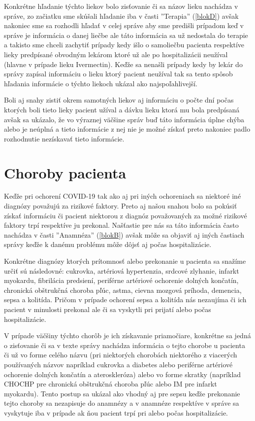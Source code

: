 Konkrétne hľadanie týchto liekov bolo zisťovanie či sa názov lieku nachádza v správe, zo začiatku sme skúšali hľadanie iba v časti ''Terapia'' (\ref{blokD}) avšak nakoniec sme sa rozhodli hľadať v celej správe aby sme predišli prípadom keď v správe je informácia o danej liečbe ale táto informácia sa už nedostala do terapie a takisto sme chceli zachytiť prípady kedy išlo o samoliečbu pacienta respektíve lieky predpísané obvodným lekárom ktoré už ale po hospitalizácii neužíval (hlavne v prípade lieku Ivermectin). Keďže sa nenašli prípady kedy by lekár do správy zapísal informáciu o lieku ktorý pacient neužíval tak sa tento spôsob hľadania informácie o týchto liekoch ukázal ako najspoľahlivejší.
 
Boli aj snahy zistiť okrem samotných liekov aj informáciu o počte dní počas ktorých boli tieto lieky pacient užíval a dávku lieku ktorá mu bola predpísaná avšak sa ukázalo, že vo výraznej väčšine správ buď táto informácia úplne chýba alebo je neúplná a tieto informácie z nej nie je možné získať preto nakoniec padlo rozhodnutie nezískavať tieto informácie.

\section{Choroby pacienta}

Keďže pri ochorení COVID-19 tak ako aj pri iných ochoreniach sa niektoré iné diagnózy považujú za rizikové faktory. Preto aj našou snahou bolo sa pokúsiť získať informáciu či pacient niektorou z diagnóz považovaných za možné rizikové faktory trpí respektíve ju prekonal. Našťastie pre nás sa táto informácia často nachádza v časti ''Anamnéza'' (\ref{blokB}) avšak môže sa objaviť aj iných častiach správy keďže k danému problému môže dôjsť aj počas hospitalizácie.

Konkrétne diagnózy ktorých prítomnosť alebo prekonanie u pacienta sa snažíme určiť sú následovné: cukrovka, artériová hypertenzia, srdcové zlyhanie, infarkt myokardu, fibrilácia predsiení, periférne artériové ochorenie dolných končatín, chronická obštrukčná choroba pľúc, astma, cievna mozgová príhoda, demencia, sepsa a kolitída. Pričom v prípade ochorení sepsa a kolitída nás nezaujíma či ich pacient v minulosti prekonal ale či sa vyskytli pri prijatí alebo počas hospitalizácie.

V prípade väčšiny týchto chorôb je ich získavanie priamočiare, konkrétne sa jedná o zisťovanie či sa v texte správy nachádza informácia o tejto chorobe u pacienta či už vo forme celého názvu (pri niektorých chorobách niektorého z viacerých používaných názvov napríklad cukrovka a diabetes alebo periférne artériové ochorenie dolných končatín a ateroskleróza) alebo vo forme skratky (napríklad CHOCHP pre chronická obštrukčná choroba pľúc alebo IM pre infarkt myokardu). Tento postup sa ukázal ako vhodný aj pre sepsu keďže prekonanie tejto choroby sa nezapisuje do anamnézy a v anamnéze respektíve v správe sa vyskytuje iba v prípade ak ňou pacient trpí pri alebo počas hospitalizácie.

